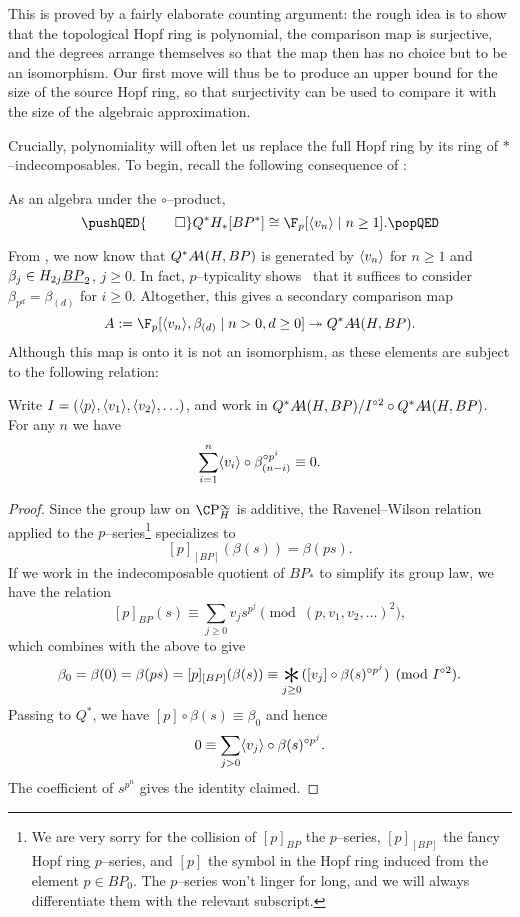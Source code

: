 \noindent This is proved by a fairly elaborate counting argument: the rough idea is to show that the topological Hopf ring is polynomial, the comparison map is surjective, and the degrees arrange themselves so that the map then has no choice but to be an isomorphism.  Our first move will thus be to produce an upper bound for the size of the source Hopf ring, so that surjectivity can be used to compare it with the size of the algebraic approximation.

Crucially, polynomiality will often let us replace the full Hopf ring by its ring of \(\ast\)--indecomposables.  To begin, recall the following consequence of :

\begin{corollary}
As an algebra under the \(\circ\)--product,
\[\pushQED{\qed}
Q^* H_*[BP^*] \cong \F_p[\<v_n\> \mid n \ge 1]. \qedhere
\popQED\]
\end{corollary}

\noindent From , we now know that \(Q^* \AA(H, BP)\) is generated by \(\<v_n\>\) for \(n \ge 1\) and \(\beta_j \in H_{2j} \OS{BP}{2}\), \(j \ge 0\).  In fact, \(p\)--typicality shows~\cite[Lemma 4.14]{RavenelWilsonHopfRingForMU} that it suffices to consider \(\beta_{p^d} = \beta_{(d)}\) for \(i \ge 0\).  Altogether, this gives a secondary comparison map \[A := \F_p[\<v_n\>, \beta_{(d)} \mid n > 0, d \ge 0] \onto Q^* \AA(H, BP).\]  Although this map is onto it is not an isomorphism, as these elements are subject to the following relation:

\begin{lemma}
Write \(I = (\<p\>, \<v_1\>, \<v_2\>, \ldots)\), and work in \(Q^* \AA(H, BP) / I^{\circ 2} \circ Q^* \AA(H, BP)\).  For any \(n\) we have \[\sum_{i=1}^n \<v_i\> \circ \beta_{(n-i)}^{\circ p^i} \equiv 0.\]
\end{lemma}
\begin{proof}
Since the group law on \(\CP^\infty_H\) is additive, the Ravenel--Wilson relation applied to the \(p\)--series\footnote{We are very sorry for the collision of \([p]_{BP}\) the \(p\)--series, \([p]_{[BP]}\) the fancy Hopf ring \(p\)--series, and \([p]\) the symbol in the Hopf ring induced from the element \(p \in BP_0\).  The \(p\)--series won't linger for long, and we will always differentiate them with the relevant subscript.} specializes to \[[p]_{[BP]}(\beta(s)) = \beta(ps).\]  If we work in the indecomposable quotient of \(BP_*\) to simplify its group law, we have the relation \[[p]_{BP}(s) \equiv \sum_{j \ge 0} v_j s^{p^j} \pmod{(p, v_1, v_2, \ldots)^2},\] which combines with the above to give \[\beta_0 = \beta(0) = \beta(ps) = [p]_{[BP]}(\beta(s)) \equiv \bigast_{j \ge 0} ([v_j] \circ \beta(s)^{\circ p^j}) \pmod{I^{\circ 2}}.\]  Passing to \(Q^*\), we have \([p] \circ \beta(s) \equiv \beta_0\) and hence \[0 \equiv \sum_{j > 0} \<v_j\> \circ \beta(s)^{\circ p^j}.\]  The coefficient of \(s^{p^n}\) gives the identity claimed.
\end{proof}

